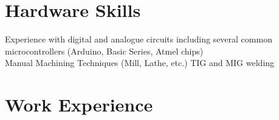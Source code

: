 \documentclass[a4paper,10pt]{article} %
\begin{document}

\section{Hardware Skills}

Experience with digital and analogue circuits including several common microcontrollers (Arduino, Basic Series, Atmel chips) \\
Manual Machining Techniques (Mill, Lathe, etc.) TIG and MIG welding\\
\vspace{0mm}



\section{Work Experience}
\end{document}
